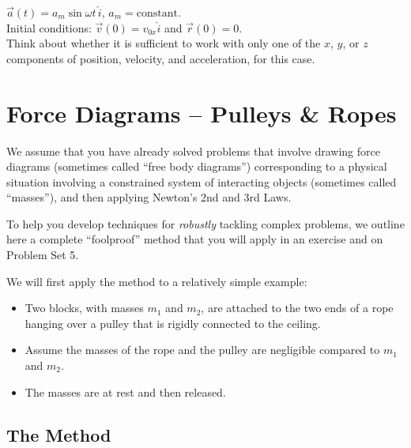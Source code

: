 \documentclass[11pt, letterpaper, openany]{book}
\newenvironment{exercise}[1][Exercise]{%
  \tcolorbox[blanker, breakable, left=1em,
    before skip=1em, after skip=1em,
    borderline west={3pt}{0pt}{PhysNavy},
    colback=PhysCream,
    before upper={\textcolor{PhysNavy}{\sffamily\bfseries #1:}\space}
  ]%
}{%
  \endtcolorbox%
}
\begin{document}
\begin{exercise}[Case B:]
$\vec{a}(t) = a_m \sin\omega t\,\hat{i}$, $a_m = \text{constant}$. \\
Initial conditions: $\vec{v}(0) = v_{0x}\hat{i}$ and $\vec{r}(0) = 0$. \\
Think about whether it is sufficient to work with only one of the $x$, $y$, or $z$ components of position, velocity, and acceleration, for this case.
\end{exercise}

\chapter{Force Diagrams -- Pulleys \& Ropes}

We assume that you have already solved problems that involve drawing force diagrams (sometimes called ``free body diagrams'') corresponding to a physical situation involving a constrained system of interacting objects (sometimes called ``masses''), and then applying Newton's 2nd and 3rd Laws.

To help you develop techniques for \textit{robustly} tackling complex problems, we outline here a complete ``foolproof'' method that you will apply in an exercise and on Problem Set 5.

We will first apply the method to a relatively simple example:
\begin{itemize}
    \item Two blocks, with masses $m_1$ and $m_2$, are attached to the two ends of a rope hanging over a pulley that is rigidly connected to the ceiling.
    \item Assume the masses of the rope and the pulley are negligible compared to $m_1$ and $m_2$.
    \item The masses are at rest and then released.
\end{itemize}

\section{The Method}
\end{document}
